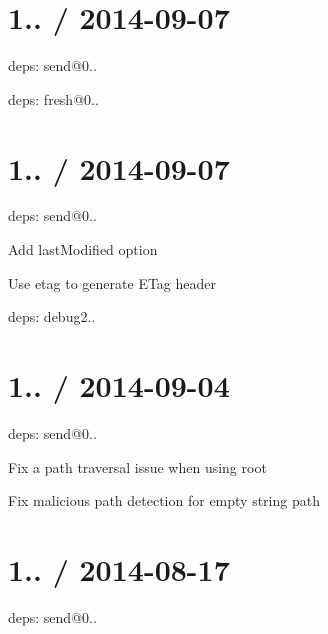 \section*{1.. / 2014-\/09-\/07 }


\begin{DoxyItemize}
\item deps\+: send@0..
\begin{DoxyItemize}
\item deps\+: fresh@0..
\end{DoxyItemize}
\end{DoxyItemize}

\section*{1.. / 2014-\/09-\/07 }


\begin{DoxyItemize}
\item deps\+: send@0..
\begin{DoxyItemize}
\item Add {\ttfamily last\+Modified} option
\item Use {\ttfamily etag} to generate {\ttfamily E\+Tag} header
\item deps\+: debug2..
\end{DoxyItemize}
\end{DoxyItemize}

\section*{1.. / 2014-\/09-\/04 }


\begin{DoxyItemize}
\item deps\+: send@0..
\begin{DoxyItemize}
\item Fix a path traversal issue when using {\ttfamily root}
\item Fix malicious path detection for empty string path
\end{DoxyItemize}
\end{DoxyItemize}

\section*{1.. / 2014-\/08-\/17 }


\begin{DoxyItemize}
\item deps\+: send@0..
\end{DoxyItemize}


